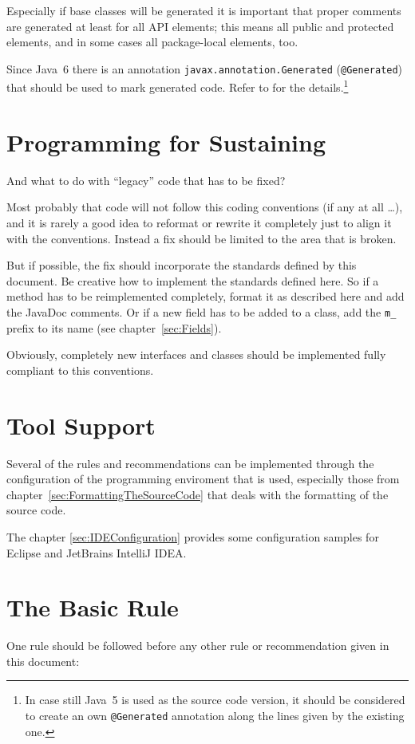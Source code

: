 \documentclass[12pt,a4paper,titlepage, parskip=half, headsepline, footsepline, cleardoubleplain]{scrbook}
\begin{document}
Especially if base classes will be generated it is important that proper comments are generated at least for all API elements; this means all public and protected elements, and in some cases all package-local elements, too.

Since Java~6 there is an annotation \lstinline|javax.annotation.Generated| (\lstinline|@Generated|) that should be used to mark generated code. Refer to \autocite{ORACLE_DOC_GENERATED_ANNOTATION} for the details.\footnote{In case still Java~5 is used as the source code version, it should be considered to create an own \lstinline|@Generated| annotation along the lines given by the existing one.}

\section{Programming for Sustaining}
And what to do with “legacy” code that has to be fixed?

Most probably that code will not follow this coding conventions (if any at all …), and it is rarely a good idea to reformat or rewrite it completely just to align it with the conventions. Instead a fix should be limited to the area that is broken.

But if possible, the fix should incorporate the standards defined by this document. Be creative how to implement the standards defined here. So if a method has to be reimplemented completely, format it as described here and add the JavaDoc comments. Or if a new field has to be added to a class, add the \lstinline|m_| prefix to its name (see chapter~\ref{sec:Fields}).

Obviously, completely new interfaces and classes should be implemented fully compliant to this conventions.

\section{Tool Support}
Several of the rules and recommendations can be implemented through the configuration of the programming enviroment that is used, especially those from chapter~\ref{sec:FormattingTheSourceCode} that deals with the formatting of the source code.

The chapter \ref{sec:IDEConfiguration} provides some configuration samples for Eclipse and JetBrains IntelliJ IDEA.

\section{The Basic Rule}\label{sec:TheBasicRule}
One rule should be followed before any other rule or recommendation given in this document:
\end{document}

